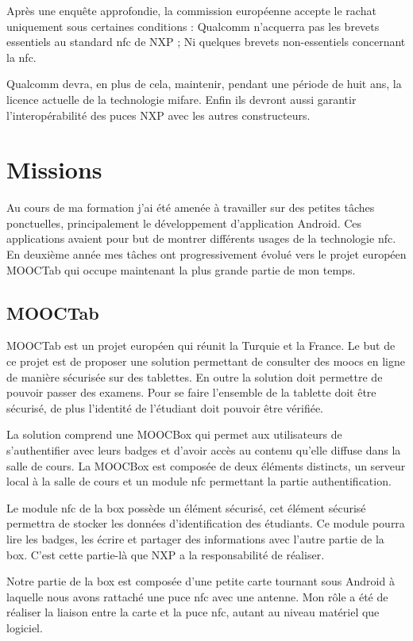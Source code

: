 \documentclass[french,12pt,a4paper,titlepage,openright,openbib]{report}
\begin{document}
Après une enquête approfondie, la commission européenne accepte le rachat uniquement sous certaines conditions :
Qualcomm n'acquerra pas les brevets essentiels au standard \gls{nfc} de NXP ; Ni quelques brevets non-essentiels concernant la \gls{nfc}.

Qualcomm devra, en plus de cela, maintenir, pendant une période de huit ans, la licence actuelle de la technologie \gls{mifare}. Enfin ils devront aussi garantir l'interopérabilité des puces NXP avec les autres constructeurs.

\chapter{Missions}
Au cours de ma formation j'ai été amenée à travailler sur des petites tâches ponctuelles, principalement le développement d'application Android. Ces applications avaient pour but de montrer différents usages de la technologie \gls{nfc}.
En deuxième année mes tâches ont progressivement évolué vers le projet européen MOOCTab qui occupe maintenant la plus grande partie de mon temps.

\section{MOOCTab}
MOOCTab est un projet européen qui réunit la Turquie et la France. Le but de ce projet est de proposer une solution permettant de consulter des \glspl{mooc} en ligne de manière sécurisée sur des tablettes. En outre la solution doit permettre de pouvoir passer des examens. Pour se faire l'ensemble de la tablette doit être sécurisé, de plus l'identité de l'étudiant doit pouvoir être vérifiée.

La solution comprend une MOOCBox qui permet aux utilisateurs de s'authentifier avec leurs badges et d'avoir accès au contenu qu'elle diffuse dans la salle de cours.
La MOOCBox est composée de deux éléments distincts, un serveur local à la salle de cours et un module \gls{nfc} permettant la partie authentification.

Le module \gls{nfc} de la box possède un élément sécurisé, cet élément sécurisé permettra de stocker les données d'identification des étudiants. Ce module pourra lire les badges, les écrire et partager des informations avec l'autre partie de la box. C'est cette partie-là que NXP a la responsabilité de réaliser.

Notre partie de la box est composée d'une petite carte tournant sous Android à laquelle nous avons rattaché une puce \gls{nfc} avec une antenne. Mon rôle a été de réaliser la liaison entre la carte et la puce \gls{nfc}, autant au niveau matériel que logiciel.
\end{document}
